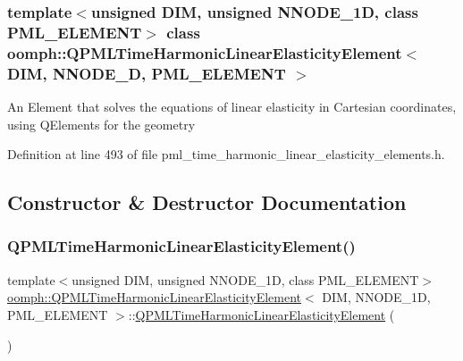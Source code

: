 \subsubsection*{template$<$unsigned D\+IM, unsigned N\+N\+O\+D\+E\+\_\+1D, class P\+M\+L\+\_\+\+E\+L\+E\+M\+E\+NT$>$\newline
class oomph\+::\+Q\+P\+M\+L\+Time\+Harmonic\+Linear\+Elasticity\+Element$<$ D\+I\+M, N\+N\+O\+D\+E\+\_\+D, P\+M\+L\+\_\+\+E\+L\+E\+M\+E\+N\+T $>$}

An Element that solves the equations of linear elasticity in Cartesian coordinates, using Q\+Elements for the geometry 

Definition at line 493 of file pml\+\_\+time\+\_\+harmonic\+\_\+linear\+\_\+elasticity\+\_\+elements.\+h.



\subsection{Constructor \& Destructor Documentation}
\mbox{\label{classoomph_1_1QPMLTimeHarmonicLinearElasticityElement_a415ccbbe94e6f67931701229f8cb9cd6}} 
\subsubsection{\texorpdfstring{Q\+P\+M\+L\+Time\+Harmonic\+Linear\+Elasticity\+Element()}{QPMLTimeHarmonicLinearElasticityElement()}}
{\footnotesize\ttfamily template$<$unsigned D\+IM, unsigned N\+N\+O\+D\+E\+\_\+1D, class P\+M\+L\+\_\+\+E\+L\+E\+M\+E\+NT$>$ \\
\hyperlink{classoomph_1_1QPMLTimeHarmonicLinearElasticityElement}{oomph\+::\+Q\+P\+M\+L\+Time\+Harmonic\+Linear\+Elasticity\+Element}$<$ D\+IM, N\+N\+O\+D\+E\+\_\+1D, P\+M\+L\+\_\+\+E\+L\+E\+M\+E\+NT $>$\+::\hyperlink{classoomph_1_1QPMLTimeHarmonicLinearElasticityElement}{Q\+P\+M\+L\+Time\+Harmonic\+Linear\+Elasticity\+Element} (\begin{DoxyParamCaption}{ }\end{DoxyParamCaption})\hspace{0.3cm}{\ttfamily [inline]}}



